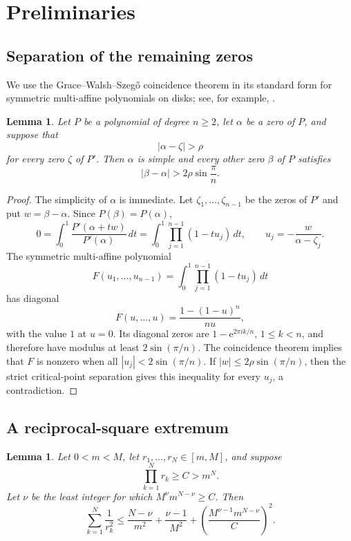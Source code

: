 \documentclass[11pt]{article}
\newtheorem{lemma}[theorem]{Lemma}
\theoremstyle{remark}
\newcommand{\e}{\mathrm e}
\begin{document}
\section{Preliminaries}

\subsection{Separation of the remaining zeros}

We use the Grace--Walsh--Szeg\H{o} coincidence theorem in its standard form for
symmetric multi-affine polynomials on disks; see, for example,
\cite{BrandenWagner}.

\begin{lemma}\label{lem:separation}
Let $P$ be a polynomial of degree $n\ge 2$, let $\alpha$ be a zero of $P$, and
suppose that
\[
 |\alpha-\zeta|>\rho
\]
for every zero $\zeta$ of $P'$.  Then $\alpha$ is simple and every other zero
$\beta$ of $P$ satisfies
\[
 |\beta-\alpha|>2\rho\sin\frac{\pi}{n}.
\]
\end{lemma}

\begin{proof}
The simplicity of $\alpha$ is immediate.  Let $\zeta_1,\ldots,\zeta_{n-1}$ be
 the zeros of $P'$ and put $w=\beta-\alpha$.  Since
$P(\beta)=P(\alpha)$,
\[
 0=\int_0^1\frac{P'(\alpha+tw)}{P'(\alpha)}\,dt
   =\int_0^1\prod_{j=1}^{n-1}(1-tu_j)\,dt,
 \qquad
 u_j=-\frac{w}{\alpha-\zeta_j}.
\]
The symmetric multi-affine polynomial
\[
 F(u_1,\ldots,u_{n-1})=\int_0^1\prod_{j=1}^{n-1}(1-tu_j)\,dt
\]
has diagonal
\[
 F(u,\ldots,u)=\frac{1-(1-u)^n}{nu},
\]
with the value $1$ at $u=0$.  Its diagonal zeros are
$1-\e^{2\pi i k/n}$, $1\le k<n$, and therefore have modulus at least
$2\sin(\pi/n)$.  The coincidence theorem implies that $F$ is nonzero when
all $|u_j|<2\sin(\pi/n)$.  If
$|w|\le 2\rho\sin(\pi/n)$, then the strict critical-point separation gives
this inequality for every $u_j$, a contradiction.
\end{proof}

\subsection{A reciprocal-square extremum}

\begin{lemma}\label{lem:sigma}
Let $0<m<M$, let $r_1,\ldots,r_N\in[m,M]$, and suppose
\[
 \prod_{k=1}^N r_k\ge C>m^N.
\]
Let $\nu$ be the least integer for which
$M^\nu m^{N-\nu}\ge C$.  Then
\[
 \sum_{k=1}^N\frac1{r_k^2}
 \le
 \frac{N-\nu}{m^2}+\frac{\nu-1}{M^2}
 +\left(\frac{M^{\nu-1}m^{N-\nu}}{C}\right)^2.
\]
\end{lemma}
\end{document}

